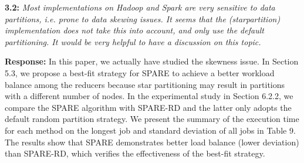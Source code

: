 \documentclass{vldb}
\begin{document}
%
%
%


\textbf{3.2:} \emph{Most implementations
on Hadoop and Spark are very sensitive to data partitions, i.e. prone to data
skewing issues. It seems that the (starpartition)
implementation does not take
this into account, and only use the default partitioning. It would be very helpful
to have a discussion on this topic.}

\textbf{Response:} In this paper, we actually have studied the skewness issue. In Section 5.3, we propose a best-fit strategy for SPARE to achieve a better workload balance among the reducers because star partitioning may result in partitions with a different number of nodes. In the experimental study in Section 6.2.2, we compare the SPARE algorithm with SPARE-RD and the latter only adopts the default random partition strategy. We present the summary of the execution time for each method on the longest job and standard deviation of all jobs in Table 9. The results show that SPARE demonstrates better load balance (lower deviation)
than SPARE-RD, which verifies the effectiveness of the best-fit strategy. 


\end{document}
